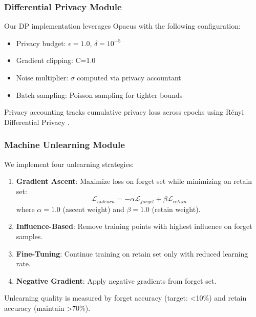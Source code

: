 \documentclass[conference]{IEEEtran}
\begin{document}
\subsubsection{Differential Privacy Module}

Our DP implementation leverages Opacus \cite{yousefpour2021opacus} with the following configuration:

\begin{itemize}
    \item Privacy budget: $\epsilon=1.0$, $\delta=10^{-5}$
    \item Gradient clipping: C=1.0
    \item Noise multiplier: $\sigma$ computed via privacy accountant
    \item Batch sampling: Poisson sampling for tighter bounds
\end{itemize}

Privacy accounting tracks cumulative privacy loss across epochs using Rényi Differential Privacy \cite{mironov2017renyi}.

\subsubsection{Machine Unlearning Module}

We implement four unlearning strategies:

\begin{enumerate}
    \item \textbf{Gradient Ascent}: Maximize loss on forget set while minimizing on retain set:
    \begin{equation}
        \mathcal{L}_{unlearn} = -\alpha \mathcal{L}_{forget} + \beta \mathcal{L}_{retain}
    \end{equation}
    where $\alpha=1.0$ (ascent weight) and $\beta=1.0$ (retain weight).

    \item \textbf{Influence-Based}: Remove training points with highest influence on forget samples.

    \item \textbf{Fine-Tuning}: Continue training on retain set only with reduced learning rate.

    \item \textbf{Negative Gradient}: Apply negative gradients from forget set.
\end{enumerate}

Unlearning quality is measured by forget accuracy (target: <10\%) and retain accuracy (maintain >70\%).
\end{document}
